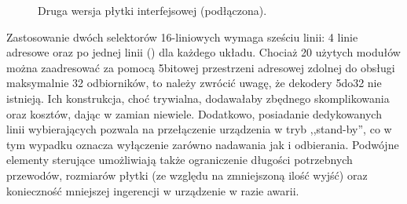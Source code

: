 \begin{figure}
 \centering
 \caption[Druga wersja płytki interfejsowej]{Druga wersja płytki interfejsowej (podłączona).}
 \label{fig:second_interface}
\end{figure}

Zastosowanie dwóch selektorów 16-liniowych wymaga sześciu linii: 4 linie adresowe oraz po jednej linii  () dla każdego układu.
Chociaż 20 użytych modułów można zaadresować za pomocą 5\ppauza{}bitowej przestrzeni adresowej zdolnej do obsługi maksymalnie 32 odbiorników, to należy zwrócić uwagę, że dekodery 5\ppauza{}do\ppauza{}32 nie istnieją.
Ich konstrukcja, choć trywialna, dodawałaby zbędnego skomplikowania oraz kosztów, dając w zamian niewiele.
Dodatkowo, posiadanie dedykowanych linii wybierających pozwala na przełączenie urządzenia w tryb ,,stand-by'', co w tym wypadku oznacza wyłączenie zarówno nadawania jak i odbierania.
Podwójne elementy sterujące umożliwiają także ograniczenie długości potrzebnych przewodów, rozmiarów płytki (ze względu na zmniejszoną ilość wyjść) oraz konieczność mniejszej ingerencji w urządzenie w razie awarii.\\
